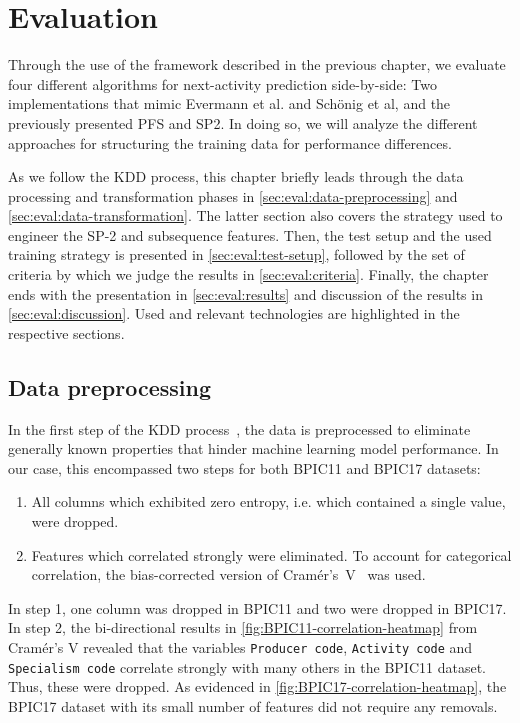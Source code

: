 \chapter{Evaluation}\label{chap:evaluation}
Through the use of the framework described in the previous chapter, we evaluate four different algorithms for next-activity prediction side-by-side: Two implementations that mimic Evermann et al. and Schönig et al, and the previously presented PFS and SP2. In doing so, we will analyze the different approaches for structuring the training data for performance differences.

As we follow the KDD process, this chapter briefly leads through the data processing and transformation phases in \autoref{sec:eval:data-preprocessing} and \autoref{sec:eval:data-transformation}. The latter section also covers the strategy used to engineer the SP-2 and subsequence features. Then, the test setup and the used training strategy is presented in \autoref{sec:eval:test-setup}, followed by the set of criteria by which we judge the results in \autoref{sec:eval:criteria}. Finally, the chapter ends with the presentation in \autoref{sec:eval:results} and discussion of the results in \autoref{sec:eval:discussion}. Used and relevant technologies are highlighted in the respective sections.

\section{Data preprocessing}
\label{sec:eval:data-preprocessing}
In the first step of the KDD process~\cite{fayyad1996data}, the data is preprocessed to eliminate generally known properties that hinder machine learning model performance. In our case, this encompassed two steps for both BPIC11 and BPIC17 datasets:

\begin{enumerate}
    \item All columns which exhibited zero entropy, i.e. which contained a single value, were dropped.
    \item Features which correlated strongly were eliminated. To account for categorical correlation, the bias-corrected version of Cramér's~V~\cite{bergsma2013bias} was used.
\end{enumerate}

In step 1, one column was dropped in BPIC11 and two were dropped in BPIC17.
In step 2, the bi-directional results in \autoref{fig:BPIC11-correlation-heatmap} from Cramér's V revealed that the variables \texttt{Producer code}, \texttt{Activity code} and \texttt{Specialism code} correlate strongly with many others in the BPIC11 dataset. Thus, these were dropped. As evidenced in \autoref{fig:BPIC17-correlation-heatmap}, the BPIC17 dataset with its small number of features did not require any removals.

